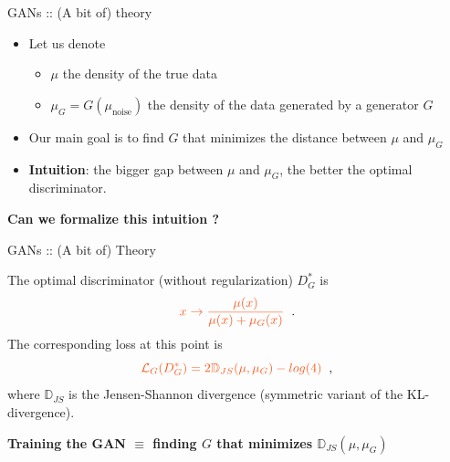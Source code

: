 \documentclass{beamer}
\begin{document}
\begin{frame}{GANs :: (A bit of) theory}
    \begin{itemize}
        \item Let us denote 
            \begin{itemize}
                \item $\mu$ the density of the true data
                \item $\mu_G = G(\mu_\text{noise})$ the density of the data generated by a generator $G$
            \end{itemize}
        \item Our main goal is to find $G$ that minimizes the distance between $\mu$ and $\mu_G$
        \item \textcolor{cOrange}{\textbf{Intuition}}: the bigger gap between $\mu$ and $\mu_G$, the better the optimal discriminator.
    \end{itemize}
    
    \begin{center}
        \textcolor{cBlue}{\textbf{Can we formalize this intuition ?}}
    \end{center}
    
    
    
\end{frame}

\begin{frame}{GANs :: (A bit of) Theory}
    \begin{theorem}
        The optimal discriminator (without regularization) $D^\ast_G$ is
        \[ \textcolor{cRed}{x \to \frac{\mu(x)}{\mu(x)+\mu_G(x)}} \;\;. \] 
        The corresponding loss at this point is 
        \[ \textcolor{cRed}{\mathcal{L}_G(D^\ast_G) = 2 \mathbb{D}_{JS}(\mu, \mu_G) - \mathop{log}(4)} \;\;, \]
        where $\mathbb{D}_{JS}$ is the Jensen-Shannon divergence (symmetric variant of the KL-divergence).
    \end{theorem}
    
    \begin{center}
        \textcolor{cBlue}{\textbf{Training the GAN $\equiv$ finding $G$ that minimizes $\mathbb{D}_{JS}(\mu, \mu_G)$}}
    \end{center}
\end{frame}
\end{document}
